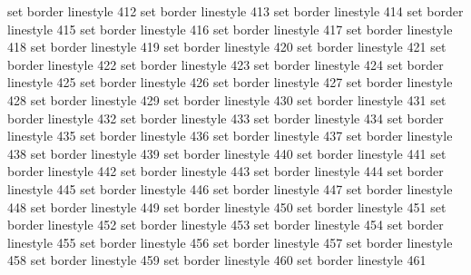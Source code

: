 set border linestyle 412
set border linestyle 413
set border linestyle 414
set border linestyle 415
set border linestyle 416
set border linestyle 417
set border linestyle 418
set border linestyle 419
set border linestyle 420
set border linestyle 421
set border linestyle 422
set border linestyle 423
set border linestyle 424
set border linestyle 425
set border linestyle 426
set border linestyle 427
set border linestyle 428
set border linestyle 429
set border linestyle 430
set border linestyle 431
set border linestyle 432
set border linestyle 433
set border linestyle 434
set border linestyle 435
set border linestyle 436
set border linestyle 437
set border linestyle 438
set border linestyle 439
set border linestyle 440
set border linestyle 441
set border linestyle 442
set border linestyle 443
set border linestyle 444
set border linestyle 445
set border linestyle 446
set border linestyle 447
set border linestyle 448
set border linestyle 449
set border linestyle 450
set border linestyle 451
set border linestyle 452
set border linestyle 453
set border linestyle 454
set border linestyle 455
set border linestyle 456
set border linestyle 457
set border linestyle 458
set border linestyle 459
set border linestyle 460
set border linestyle 461
